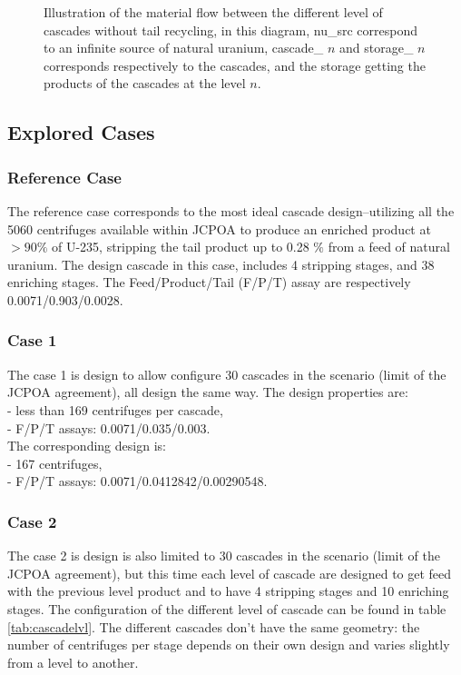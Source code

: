 \documentclass{anstrans}
\begin{document}
\begin{figure}[ht]
  \caption{Illustration of the material flow between the different level of
      cascades without tail recycling, in this diagram, nu\_src correspond to an
      infinite source of natural uranium, cascade\_ $n$ and storage\_ $n$
      corresponds respectively to the cascades, and the storage getting the
  products of the cascades at the level $n$.}\label{fig:flow}
\end{figure}

\subsection{Explored Cases}
\subsubsection{Reference Case}
The reference case corresponds to the most ideal cascade design--utilizing all the 5060
centrifuges available within JCPOA to produce an enriched product at $>90\%$ of U-235,
stripping the tail product up to 0.28 $\%$ from a feed of natural uranium.
The design cascade in this case, includes 4 stripping stages, and 38 enriching
stages. The Feed/Product/Tail (F/P/T) assay are respectively
0.0071/0.903/0.0028.

\subsubsection{Case 1}
The case 1 is design to allow configure 30 cascades in the scenario (limit of
the JCPOA agreement), all design the same way. The design properties are:\\
- less than 169 centrifuges per cascade,\\
- F/P/T assays: 0.0071/0.035/0.003.\\
The corresponding design is:\\
- 167 centrifuges,\\
- F/P/T assays: 0.0071/0.0412842/0.00290548.\\

\subsubsection{Case 2}
The case 2 is design is also limited to 30 cascades in the scenario (limit of
the JCPOA agreement), but this time each level of cascade are designed to get
feed with the previous level product and to have 4 stripping stages and 10
enriching stages. The configuration of the different level of cascade can be
found in table \ref{tab:cascadelvl}. The different cascades don't have the same
geometry: the number of centrifuges per stage depends on their own design and
varies slightly from a level to another.
\end{document}
